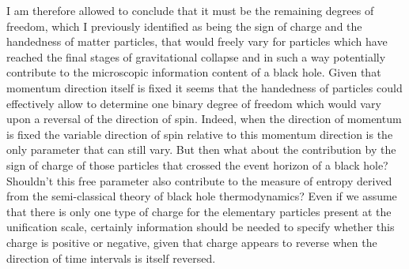 \documentclass[notitlepage,12pt]{report}
\begin{document}
I am therefore allowed to conclude that it must be the remaining degrees of freedom, which I previously identified as being the sign of charge and the handedness of matter particles, that would freely vary for particles which have reached the final stages of gravitational collapse and in such a way potentially contribute to the microscopic information content of a black hole. Given that momentum direction itself is fixed it seems that the handedness of particles could effectively allow to determine one binary degree of freedom which would vary upon a reversal of the direction of spin. Indeed, when the direction of momentum is fixed the variable direction of spin relative to this momentum direction is the only parameter that can still vary. But then what about the contribution by the sign of charge of those particles that crossed the event horizon of a black hole? Shouldn't this free parameter also contribute to the measure of entropy derived from the semi-classical theory of black hole thermodynamics? Even if we assume that there is only one type of charge for the elementary particles present at the unification scale, certainly information should be needed to specify whether this charge is positive or negative, given that charge appears to reverse when the direction of time intervals is itself reversed.
\end{document}
